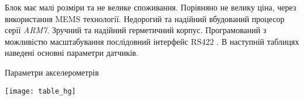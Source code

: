 Блок має малі розміри та не велике споживання. Порівняно не велику ціна, через
використання MEMS технології. Недорогий та надійний вбудований процесор серії
\textit{ARM7}. Зручний та надійний герметичний корпус. Програмований з можливістю
масштабування послідовний інтерфейс RS422 .
В наступній таблицях наведені основні параметри датчиків.
\begin{table}[here]
\centering
\caption{Параметри акселерометрів}
\texttt{[image: table\_hg]}

\label{tab:table_hg}
\end{table}










% 
% 
% 

